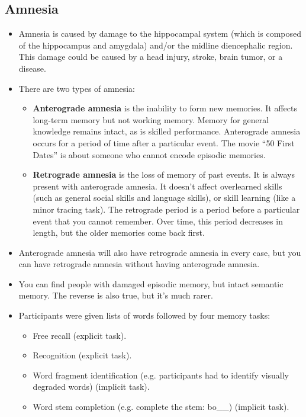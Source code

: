 \documentclass[]{article}
\begin{document}
		\subsection{Amnesia}
			\begin{itemize}
				\item Amnesia is caused by damage to the hippocampal system (which is composed of the hippocampus and amygdala) and/or the midline diencephalic region. This damage could be caused by a head injury, stroke, brain tumor, or a disease.
				\item There are two types of amnesia:
					\begin{itemize}
						\item \textbf{Anterograde amnesia} is the inability to form new memories. It affects long-term memory but not working memory. Memory for general knowledge remains intact, as is skilled performance. Anterograde amnesia occurs for a period of time after a particular event. The movie ``50 First Dates'' is about someone who cannot encode episodic memories.
						\item \textbf{Retrograde amnesia} is the loss of memory of past events. It is always present with anterograde amnesia. It doesn't affect overlearned skills (such as general social skills and language skills), or skill learning (like a minor tracing task). The retrograde period is a period before a particular event that you cannot remember. Over time, this period decreases in length, but the older memories come back first.
					\end{itemize}
				\item Anterograde amnesia will also have retrograde amnesia in every case, but you can have retrograde amnesia without having anterograde amnesia.
				\item You can find people with damaged episodic memory, but intact semantic memory. The reverse is also true, but it's much rarer.
				\item Participants were given lists of words followed by four memory tasks:
					\begin{itemize}
						\item Free recall (explicit task).
						\item Recognition (explicit task).
						\item Word fragment identification (e.g. participants had to identify visually degraded words) (implicit task).
						\item Word stem completion (e.g. complete the stem: bo\_\_) (implicit task).
					\end{itemize}

\end{itemize}
\end{document}
